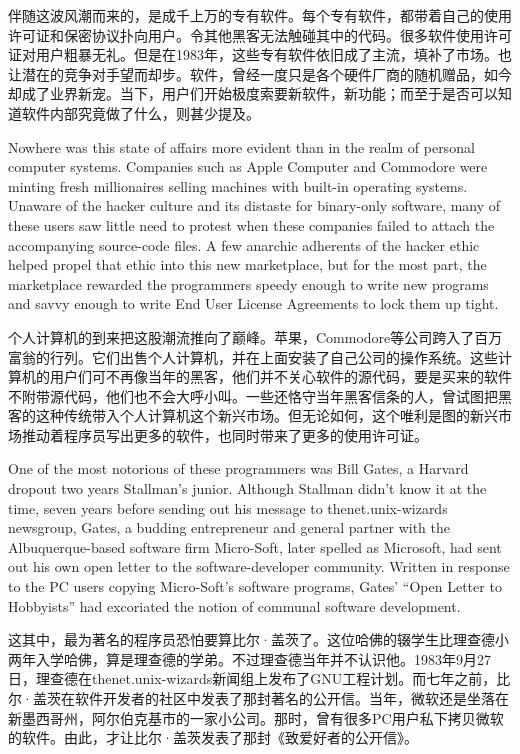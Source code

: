 \ifdefined\chs
伴随这波风潮而来的，是成千上万的专有软件。每个专有软件，都带着自己的使用许可证和保密协议扑向用户。令其他黑客无法触碰其中的代码。很多软件使用许可证对用户粗暴无礼。但是在1983年，这些专有软件依旧成了主流，填补了市场。也让潜在的竞争对手望而却步。软件，曾经一度只是各个硬件厂商的随机赠品，如今却成了业界新宠。当下，用户们开始极度索要新软件，新功能；而至于是否可以知道软件内部究竟做了什么，则甚少提及。
\fi

\ifdefined\eng
Nowhere was this state of affairs more evident than in the realm of personal computer systems. Companies such as Apple Computer and Commodore were minting fresh millionaires selling machines with built-in operating systems. Unaware of the hacker culture and its distaste for binary-only software, many of these users saw little need to protest when these companies failed to attach the accompanying source-code files. A few anarchic adherents of the hacker ethic helped propel that ethic into this new marketplace, but for the most part, the marketplace rewarded the programmers speedy enough to write new programs and savvy enough to write End User License Agreements to lock them up tight.
\fi

\ifdefined\chs
个人计算机的到来把这股潮流推向了巅峰。苹果，Commodore等公司跨入了百万富翁的行列。它们出售个人计算机，并在上面安装了自己公司的操作系统。这些计算机的用户们可不再像当年的黑客，他们并不关心软件的源代码，要是买来的软件不附带源代码，他们也不会大呼小叫。一些还恪守当年黑客信条的人，曾试图把黑客的这种传统带入个人计算机这个新兴市场。但无论如何，这个唯利是图的新兴市场推动着程序员写出更多的软件，也同时带来了更多的使用许可证。
\fi

\ifdefined\eng
One of the most notorious of these programmers was Bill Gates, a Harvard dropout two years Stallman's junior. Although Stallman didn't know it at the time, seven years before sending out his message to thenet.unix-wizards newsgroup, Gates, a budding entrepreneur and general partner with the Albuquerque-based software firm Micro-Soft, later spelled as Microsoft, had sent out his own open letter to the software-developer community. Written in response to the PC users copying Micro-Soft's software programs, Gates' ``Open Letter to Hobbyists'' had excoriated the notion of communal software development.
\fi

\ifdefined\chs
这其中，最为著名的程序员恐怕要算比尔·盖茨了。这位哈佛的辍学生比理查德小两年入学哈佛，算是理查德的学弟。不过理查德当年并不认识他。1983年9月27日，理查德在thenet.unix-wizards新闻组上发布了GNU工程计划。而七年之前，比尔·盖茨在软件开发者的社区中发表了那封著名的公开信。当年，微软还是坐落在新墨西哥州，阿尔伯克基市的一家小公司。那时，曾有很多PC用户私下拷贝微软的软件。由此，才让比尔·盖茨发表了那封《致爱好者的公开信》。
\fi

